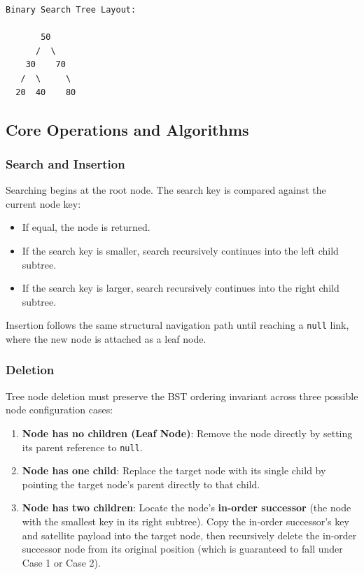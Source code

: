 \documentclass[12pt]{report}
\begin{document}
\begin{verbatim}
Binary Search Tree Layout:

       50
      /  \
    30    70
   /  \     \
  20  40    80
\end{verbatim}

\subsection{Core Operations and Algorithms}

\subsubsection{Search and Insertion}
Searching begins at the root node. The search key is compared against the current node key:
\begin{itemize}
    \item If equal, the node is returned.
    \item If the search key is smaller, search recursively continues into the left child subtree.
    \item If the search key is larger, search recursively continues into the right child subtree.
\end{itemize}
Insertion follows the same structural navigation path until reaching a \texttt{null} link, where the new node is attached as a leaf node.

\subsubsection{Deletion}
Tree node deletion must preserve the BST ordering invariant across three possible node configuration cases:
\begin{enumerate}
    \item \textbf{Node has no children (Leaf Node)}: Remove the node directly by setting its parent reference to \texttt{null}.
    \item \textbf{Node has one child}: Replace the target node with its single child by pointing the target node's parent directly to that child.
    \item \textbf{Node has two children}: Locate the node's \textbf{in-order successor} (the node with the smallest key in its right subtree). Copy the in-order successor's key and satellite payload into the target node, then recursively delete the in-order successor node from its original position (which is guaranteed to fall under Case 1 or Case 2).
\end{enumerate}
\end{document}
